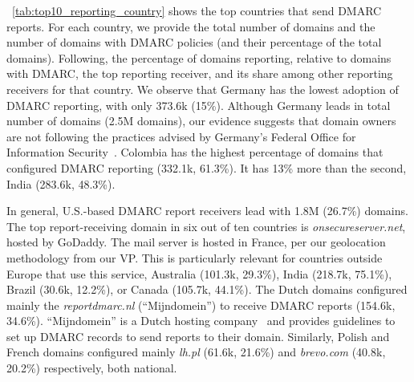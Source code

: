 
~\cref{tab:top10_reporting_country} shows the top countries that send \gls{DMARC} reports.
For each country, we provide the total number of domains and the number of domains with \gls{DMARC} policies (and their percentage of the total domains). Following, the percentage of domains reporting, relative to domains with \gls{DMARC}, the top reporting receiver, and its share among other reporting receivers for that country.
We observe that Germany has the lowest adoption of \gls{DMARC} reporting, with only 373.6k (15\%). Although Germany leads in total number of domains (2.5M domains), our evidence suggests that domain owners are not following the practices advised by Germany's Federal Office for Information Security~\cite{_BSITR03182Email_}.
Colombia has the highest percentage of domains that configured \gls{DMARC} reporting (332.1k, 61.3\%).
It has 13\% more than the second, India (283.6k, 48.3\%).

In general, U.S.-based \gls{DMARC} report receivers lead with 1.8M (26.7\%) domains. The top report-receiving domain in six out of ten countries is \textit{onsecureserver.net}, hosted by GoDaddy. The mail server is hosted in France, per our geolocation methodology from our \gls{VP}. This is particularly relevant for countries outside Europe that use this service, \eg Australia (101.3k, 29.3\%), India (218.7k, 75.1\%), Brazil (30.6k, 12.2\%), or Canada (105.7k, 44.1\%).
The Dutch domains configured mainly the \textit{reportdmarc.nl} (``Mijndomein'') to receive \gls{DMARC} reports (154.6k, 34.6\%). ``Mijndomein'' is a Dutch hosting company~\cite{_JeDomeinnaamKoppelen_} and provides guidelines to set up \gls{DMARC} records to send reports to their domain.
Similarly, Polish and French domains configured mainly \textit{lh.pl} (61.6k, 21.6\%) and \textit{brevo.com} (40.8k, 20.2\%) respectively, both national.

